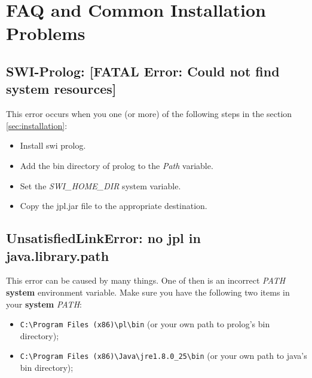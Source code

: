 ﻿\section{FAQ and Common Installation Problems}
\label{sec:faq}

\subsection{SWI-Prolog: [FATAL Error: Could not find system resources]}

This error occurs when you one (or more) of the following steps in the section \ref{sec:installation}:
\begin{itemize}
\item Install swi prolog.
\item Add the bin directory of prolog to the \emph{Path} variable.
\item Set the \emph{SWI\_HOME\_DIR} system variable.
\item Copy the jpl.jar file to the appropriate destination.
\end{itemize}

\subsection{UnsatisfiedLinkError: no jpl in java.library.path}

This error can be caused by many things. One of then is an incorrect \emph{PATH} \textbf{system} environment variable.
Make sure you have the following two items in your \textbf{system} \emph{PATH}:
\begin{itemize}
	\item \verb=C:\Program Files (x86)\pl\bin= (or your own path to prolog's bin
	directory);
	\item \verb=C:\Program Files (x86)\Java\jre1.8.0_25\bin= (or your own path
	to java's bin directory);
\end{itemize}

